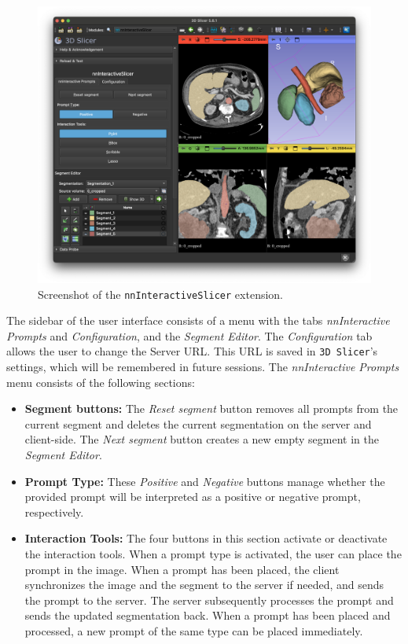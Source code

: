 \documentclass[
]{article}
\begin{document}
\begin{figure}
\centering
\includegraphics{img/screenshot.png}
\caption{Screenshot of the \texttt{nnInteractiveSlicer}
extension.\label{fig:screenshot}}
\end{figure}

The sidebar of the user interface consists of a menu with the tabs
\emph{nnInteractive Prompts} and \emph{Configuration}, and the
\emph{Segment Editor}. The \emph{Configuration} tab allows the user to
change the Server URL. This URL is saved in \texttt{3D\ Slicer}'s
settings, which will be remembered in future sessions. The
\emph{nnInteractive Prompts} menu consists of the following sections:

\begin{itemize}
\item
  \textbf{Segment buttons:} The \emph{Reset segment} button removes all
  prompts from the current segment and deletes the current segmentation
  on the server and client-side. The \emph{Next segment} button creates
  a new empty segment in the \emph{Segment Editor}.
\item
  \textbf{Prompt Type:} These \emph{Positive} and \emph{Negative}
  buttons manage whether the provided prompt will be interpreted as a
  positive or negative prompt, respectively.
\item
  \textbf{Interaction Tools:} The four buttons in this section activate
  or deactivate the interaction tools. When a prompt type is activated,
  the user can place the prompt in the image. When a prompt has been
  placed, the client synchronizes the image and the segment to the
  server if needed, and sends the prompt to the server. The server
  subsequently processes the prompt and sends the updated segmentation
  back. When a prompt has been placed and processed, a new prompt of the
  same type can be placed immediately.
\end{itemize}
\end{document}
